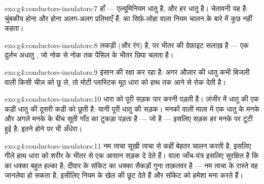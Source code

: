 \begin{solution}{exo:g4:conductors-insulators:7}
हाँ --- एल्यूमिनियम धातु है, और हर धातु  है। चेतावनी यह है:
चुंबकीय होना और  होना अलग-अलग प्रतिभाएँ हैं;  का
सिर्फ़-लोहा वाला नियम चालन के बारे में कुछ नहीं कहता।
\end{solution}

\begin{solution}{exo:g4:conductors-insulators:8}
लकड़ी (और रंग)  है, पर भीतर की ग्रेफ़ाइट सलाख़  है ---
एक दुर्लभ अधातु , जो नोक से नोक तक पेंसिल के भीतर छिपा चलता है।
\end{solution}

\begin{solution}{exo:g4:conductors-insulators:9}
 इंसान की रक्षा कर रहा है: अगर औज़ार की धातु कभी बिजली
वाली किसी चीज़ को छू ले, तो मोटी प्लास्टिक मूठ धारा को हाथ तक आने से
रोक देती है।
\end{solution}

\begin{solution}{exo:g4:conductors-insulators:10}
धारा को पूरी सड़क पार करनी पड़ती है। ज़ंजीर में धातु की एक कड़ी धातु
की दूसरी कड़ी को छूती है: यानी पूरी धातु की सड़क। मनकों वाली माला में
एक धातु के मनके और अगले मनके के बीच सूती गाँठ का टुकड़ा पड़ता है ---
जो  है --- इसलिए सड़क हर मनके पर टूटी हुई है: इतने 
होने पर भी अँधेरा।
\end{solution}

\begin{solution}{exo:g4:conductors-insulators:11}
नम त्वचा सूखी त्वचा से कहीं बेहतर चालन करती है, इसलिए गीले हाथ धारा
को शरीर के भीतर से एक आसान सड़क दे देते हैं।  वाला जाँच-यंत्र
इसलिए सुरक्षित है कि  का धक्का बहुत हल्का है; दीवार के सॉकेट का
धक्का सैकड़ों गुना ताक़तवर है --- नम त्वचा के रास्ते वह जानलेवा हो
सकता है, इसीलिए नियम  के खेल की छूट देते हैं और सॉकेट को हमेशा
मना करते हैं।
\end{solution}
